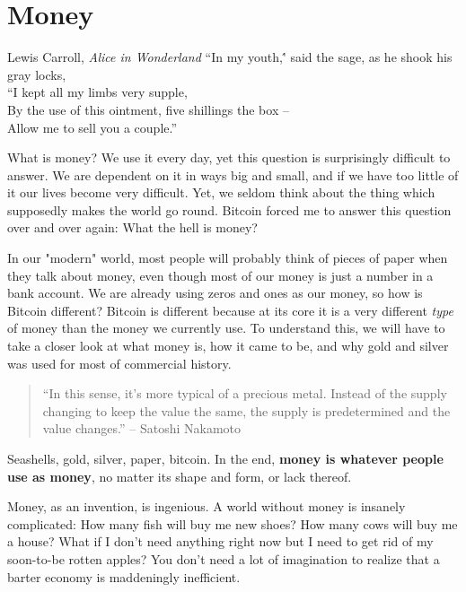 \chapter{Money}
\label{les:11}

\begin{chapquote}{Lewis Carroll, \textit{Alice in Wonderland}}
``In my youth,\'' said the sage, as he shook his gray locks, \\
``I kept all my limbs very supple, \\
By the use of this ointment, five shillings the box -- \\
Allow me to sell you a couple.''
\end{chapquote}

What is money? We use it every day, yet this question is surprisingly
difficult to answer. We are dependent on it in ways big and small, and
if we have too little of it our lives become very difficult. Yet, we
seldom think about the thing which supposedly makes the world go round.
Bitcoin forced me to answer this question over and over again: What the
hell is money?

In our "modern" world, most people will probably think of pieces of
paper when they talk about money, even though most of our money is just
a number in a bank account. We are already using zeros and ones as our
money, so how is Bitcoin different? Bitcoin is different because at its
core it is a very different \textit{type} of money than the money we currently
use. To understand this, we will have to take a closer look at what
money is, how it came to be, and why gold and silver was used for most
of commercial history.

\begin{quotation}
``In this sense, it's more typical of a precious metal. Instead of the
supply changing to keep the value the same, the supply is
predetermined and the value changes.''
\flushright -- Satoshi Nakamoto %
\end{quotation}

Seashells, gold, silver, paper, bitcoin. In the end, \textbf{money is whatever
people use as money}, no matter its shape and form, or lack thereof.

Money, as an invention, is ingenious. A world without money is insanely
complicated: How many fish will buy me new shoes? How many cows will buy
me a house? What if I don't need anything right now but I need to get
rid of my soon-to-be rotten apples? You don't need a lot of imagination
to realize that a barter economy is maddeningly inefficient.


